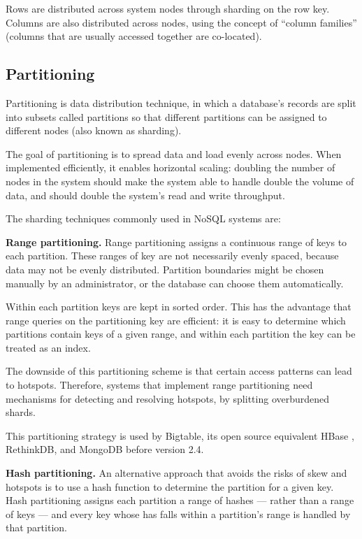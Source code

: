 Rows are distributed across system nodes through sharding on the row key.
Columns are also distributed across nodes, using the concept of ``column families'' (columns that are usually accessed
together are co-located).

\subsection{Partitioning}
\label{sec:partitioning}

Partitioning is data distribution technique, in which a database's records are split into subsets called partitions so
that different partitions can be assigned to different nodes (also known as sharding).

The goal of partitioning is to spread data and load evenly across nodes.
When implemented efficiently, it enables horizontal scaling:
doubling the number of nodes in the system should make the system able to handle double the volume of data, and
should double the system's read and write throughput.

The sharding techniques commonly used in NoSQL systems are:

\bigskip
\noindent
\textbf{Range partitioning.}
Range partitioning assigns a continuous range of keys to each partition.
These ranges of key are not necessarily evenly spaced, because data may not be evenly distributed.
Partition boundaries might be chosen manually by an administrator, or the database can choose them automatically.

Within each partition keys are kept in sorted order.
This has the advantage that range queries on the partitioning key are efficient:
it is easy to determine which partitions contain keys of a given range, and within each partition the key can be treated
as an index.

The downside of this partitioning scheme is that certain access patterns can lead to hotspots.
Therefore, systems that implement range partitioning need mechanisms for detecting and resolving hotspots, by splitting
overburdened shards.

This partitioning strategy is used by Bigtable, its open source equivalent HBase \cite{hbasebigtable:comparison}, RethinkDB,
and MongoDB before version 2.4.

\bigskip
\noindent
\textbf{Hash partitioning.}
An alternative approach that avoids the risks of skew and hotspots is to use a hash function to determine the partition
for a given key.
Hash partitioning assigns each partition a range of hashes --- rather than a range of keys --- and every key whose has
falls within a partition's range is handled by that partition.

